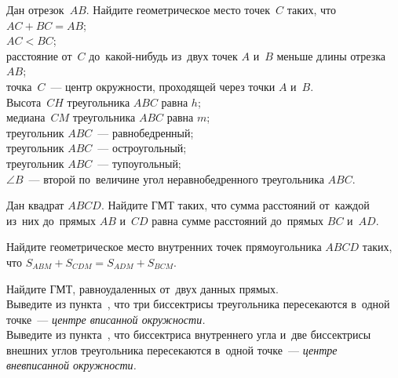 \begin{problems}

\item
Дан отрезок~$AB$.
Найдите геометрическое место точек~$C$ таких, что
\\
\subproblem $AC + BC = AB$;
\\
\subproblem $AC < BC$;
\\
\subproblem
расстояние от~$C$ до~какой-нибудь из~двух точек $A$ и~$B$ меньше длины
отрезка~$AB$;
\\
\subproblem
точка~$C$~--- центр окружности, проходящей через точки $A$ и~$B$.
\\
\subproblem
Высота~$CH$ треугольника $ABC$ равна $h$;
\\
\subproblem
медиана~$CM$ треугольника $ABC$ равна $m$;
\\
\subproblem
треугольник $ABC$~--- равнобедренный;
\\
\subproblem
треугольник $ABC$~--- остроугольный;
\\
\subproblem
треугольник $ABC$~--- тупоугольный;
\\
\subproblem
$\angle B$~--- второй по~величине угол неравнобедренного треугольника $ABC$.



\item
Дан квадрат $ABCD$.
Найдите ГМТ таких, что сумма расстояний от~каждой из~них до~прямых $AB$ и~$CD$
равна сумме расстояний до~прямых $BC$ и~$AD$.

\item
Найдите геометрическое место внутренних точек прямоугольника $ABCD$ таких, что
$S_{ABM} + S_{CDM} = S_{ADM} + S_{BCM}$.

\item
\subproblem{}%
Найдите ГМТ, равноудаленных от~двух данных прямых.
\\
\subproblem
Выведите из пункта~,
что три биссектрисы треугольника пересекаются в~одной точке~---
\emph{центре вписанной окружности.}
\\
\subproblem
Выведите из пункта~,
что биссектриса внутреннего угла и~две биссектрисы внешних углов
треугольника пересекаются в~одной точке~---
\emph{центре вневписанной окружности.}


\end{problems}
